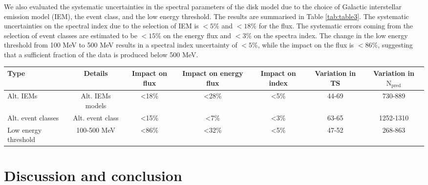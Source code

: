 \documentclass[fleqn,usenatbib]{mnras}
\begin{document}
We also evaluated the systematic uncertainties in the spectral parameters of the disk model due to the choice of Galactic interstellar emission model (IEM), the event class, and the low energy threshold. The results are summarised in Table \ref{tab:table3}. The systematic uncertainties on the spectral index due to the selection of IEM is $\mathrm{<5\%}$ and $\mathrm{<18\%}$ for the flux. The systematic errors coming from the selection of event classes are estimated to be $\mathrm{<15\%}$ on the energy flux and $\mathrm{<3\%}$ on the spectra index. The change in the low energy threshold from 100 MeV to 500 MeV results in a spectral index uncertainty of $\mathrm{<5\%}$, while the impact on the flux is $\mathrm{<86\%}$, suggesting that a sufficient fraction of the data is produced below 500 MeV.




\begin{table*}
\caption{Summary of the main systematic uncertainties estimated for the disk model.}
\centering
\label{tab:table3}
\begin{threeparttable}
\begin{tabular}{lcccccc}
    \hline
    Type & Details & Impact on flux & Impact on energy flux& Impact on index & Variation in TS & Variation in $\mathrm{N_{pred}}$ \\
    \hline
    Alt. IEMs & Alt. IEMs models & <18\% & <28\% & <5\% & 44-69 & 730-889\\
    Alt. event classes & Alt. event class & <15\% & <7\%& <3\% & 63-65 & 1252-1310\\
    Low energy threshold & 100-500 MeV & <86\% & <32\%& <5\%  & 47-52 & 268-863\\
    \hline
\end{tabular}
\end{threeparttable}
\end{table*}

\section{Discussion and conclusion}
\end{document}
